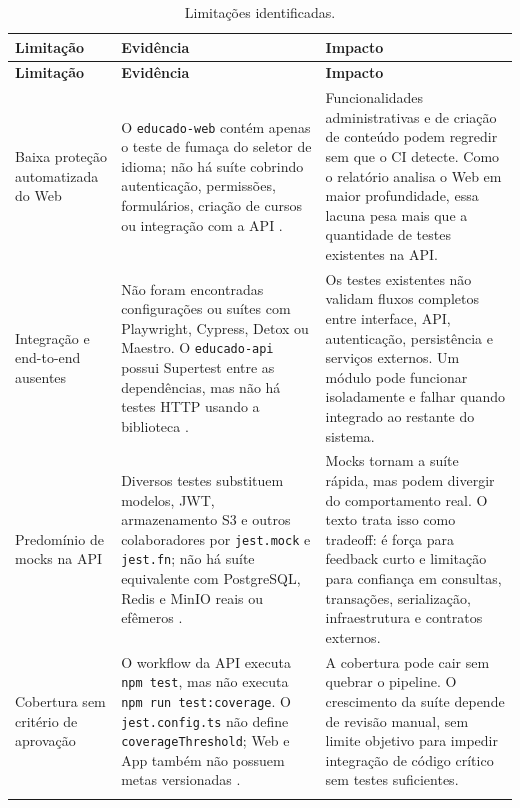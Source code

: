 {\footnotesize
\begin{longtable}{>{\raggedright\arraybackslash}p{2.9cm} >{\raggedright\arraybackslash}p{5.1cm} >{\raggedright\arraybackslash}p{5.1cm}}
\caption{Limitações identificadas.}
\label{tab:limitacoes}\\
\toprule
\textbf{Limitação} & \textbf{Evidência} & \textbf{Impacto} \\
\midrule
\endfirsthead

\toprule
\textbf{Limitação} & \textbf{Evidência} & \textbf{Impacto} \\
\midrule
\endhead

Baixa proteção automatizada do Web
&
O \texttt{educado-web} contém apenas o teste de fumaça
do seletor de idioma; não há suíte cobrindo autenticação, permissões,
formulários, criação de cursos ou integração com a API \cite{educado-repos}.
&
Funcionalidades administrativas e de criação de conteúdo podem regredir sem que
o CI detecte. Como o relatório analisa o Web em maior profundidade, essa lacuna
pesa mais que a quantidade de testes existentes na API.
\\
\addlinespace

Integração e end-to-end ausentes
&
Não foram encontradas configurações ou suítes com Playwright, Cypress, Detox ou
Maestro. O \texttt{educado-api} possui Supertest entre as dependências, mas não
há testes HTTP usando a biblioteca \cite{educado-repos}.
&
Os testes existentes não validam fluxos completos entre interface, API,
autenticação, persistência e serviços externos. Um módulo pode funcionar
isoladamente e falhar quando integrado ao restante do sistema.
\\
\addlinespace

Predomínio de mocks na API
&
Diversos testes substituem modelos, JWT, armazenamento S3 e outros
colaboradores por \texttt{jest.mock} e \texttt{jest.fn}; não há suíte equivalente
com PostgreSQL, Redis e MinIO reais ou efêmeros \cite{educado-repos}.
&
Mocks tornam a suíte rápida, mas podem divergir do comportamento real. O texto
trata isso como tradeoff: é força para feedback curto e limitação para confiança
em consultas, transações, serialização, infraestrutura e contratos externos.
\\
\addlinespace

Cobertura sem critério de aprovação
&
O workflow da API executa \texttt{npm test}, mas não executa
\texttt{npm run test:coverage}. O \texttt{jest.config.ts} não define
\texttt{coverageThreshold}; Web e App também não possuem metas versionadas
\cite{educado-repos}.
&
A cobertura pode cair sem quebrar o pipeline. O crescimento da suíte depende de
revisão manual, sem limite objetivo para impedir integração de código crítico
sem testes suficientes.
\\
\addlinespace


\end{longtable}}
